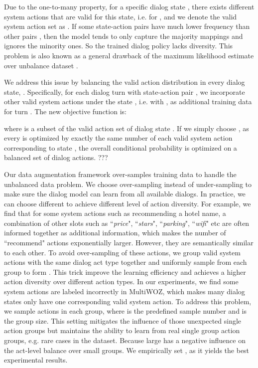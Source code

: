 \documentclass[letterpaper]{article} \usepackage{aaai20}  \usepackage{times}  \usepackage{helvet} \usepackage{courier}  \usepackage[hyphens]{url}  \usepackage{graphicx} \urlstyle{rm} \def\UrlFont{\rm}  \usepackage{graphicx}  \frenchspacing  \setlength{\pdfpagewidth}{8.5in}  \setlength{\pdfpageheight}{11in}  \usepackage{multirow}
\begin{document}
	
	Due to the one-to-many property, for a specific dialog state , there exists  different system actions  that are valid for this state, i.e. for , and we denote the valid system action set as . If some state-action pairs  have much lower frequency than other pairs ,
then the model tends to only capture the majority mappings and ignores the minority ones. So the trained dialog policy lacks diversity. This problem is also known as a general drawback of the maximum likelihood estimate over unbalance dataset \cite{jennrich1986unbalanced}. 
	
	We address this issue by balancing the valid action distribution in every dialog state, . Specifically, for each dialog turn  with state-action pair , we incorporate other valid system actions under the state , i.e.  with , as additional training data for turn . The new objective function is: 
	
	where  is a subset of the valid action set  of dialog state . If we simply choose , as every  is optimized by exactly the same number of each valid system action corresponding to state , the overall conditional probability  is optimized on a balanced set of dialog actions. ???
	
	
	
	Our data augmentation framework over-samples training data to handle the unbalanced data problem. We choose over-sampling instead of under-sampling to make sure the dialog model can learn from all available dialogs. In practice, we can choose different  to achieve different level of action diversity. For example, we find that for some system actions such as recommending a hotel name, a combination of other slots such as ``\textit{price}", ``\textit{stars}", ``\textit{parking}", ``\textit{wifi}" etc are often informed together as additional information, which makes the number of ``recommend" actions exponentially larger. However, they are semantically similar to each other. To avoid over-sampling of these actions, we group valid system actions with the same dialog act type together and uniformly sample from each group to form  . This trick improve the learning efficiency and achieves a higher action diversity over different action types. In our experiments, we find some system actions are labeled incorrectly in MultiWOZ, which makes many dialog states only have one corresponding valid system action. To address this problem, we sample  actions in each group, where  is the predefined sample number and  is the group size. This setting mitigates the influence of those unexpected single action groups but maintains the ability to learn from real single group action groups, e.g. rare cases in the dataset. Because large  has a negative influence on the act-level balance over small groups. We empirically set , as it yields the best experimental results. 
	
\end{document}
